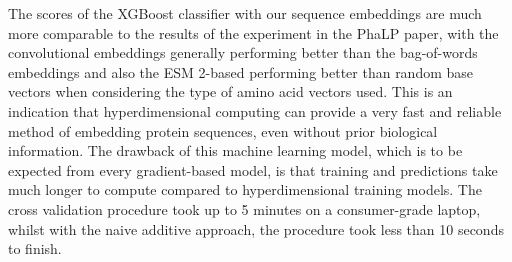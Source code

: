 \begin{table}[h]
    \caption{\label{tab:phalpclass}Results of type classifications using the principal classification technique of hyperdimensional computing, an XGBoost classifier and OnlineHD implementations with several kinds of embeddings}
\end{table}

The scores of the XGBoost classifier with our sequence embeddings are much more comparable to the results of the experiment in the PhaLP paper, with the convolutional embeddings generally performing better than the bag-of-words embeddings and also the ESM 2-based performing better than random base vectors when considering the type of amino acid vectors used. This is an indication that hyperdimensional computing can provide a very fast and reliable method of embedding protein sequences, even without prior biological information. The drawback of this machine learning model, which is to be expected from every gradient-based model, is that training and predictions take much longer to compute compared to hyperdimensional training models. The cross validation procedure took up to 5 minutes on a consumer-grade laptop, whilst with the naive additive approach, the procedure took less than 10 seconds to finish.

